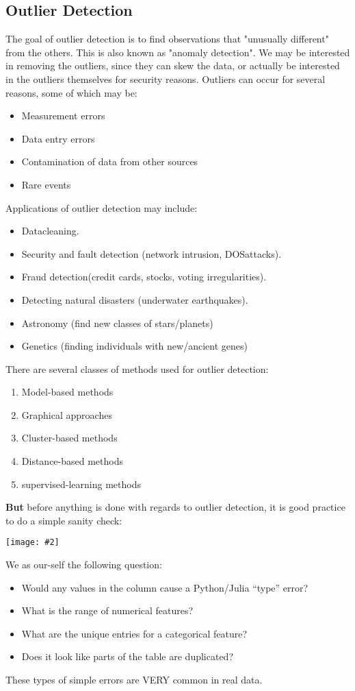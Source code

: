\documentclass{article}
\def\blu#1{{\color{blu}#1}}
\def\gre#1{{\color{gre}#1}}
\theoremstyle{definition}
\newcommand{\centerfig}[2]{\begin{center}\texttt{[image: \#2]}\end{center}}
\begin{document}
\subsection*{Outlier Detection}
The goal of outlier detection is to find observations that "unusually different" from the others. This is also known as "anomaly detection". We may be interested in removing the outliers, since they can skew the data, or actually be interested in the outliers themselves for security reasons. Outliers can occur for several reasons, some of which may be:
\begin{multicols}{2}
	\begin{itemize}
	\item Measurement errors
	\item Data entry errors
	\item Contamination of data from other sources
	\item Rare events
\end{itemize}
\end{multicols}
Applications of outlier detection may include:
\begin{itemize}
	\item Datacleaning.
	\item Security and fault detection (network intrusion, DOSattacks).
	\item Fraud detection(credit cards, stocks, voting irregularities).
	\item Detecting natural disasters (underwater earthquakes).
	\item Astronomy (find new classes of stars/planets)
	\item Genetics (finding individuals with new/ancient genes)
\end{itemize}
There are several classes of methods used for outlier detection:
\begin{enumerate}
	\item Model-based methods
	\item Graphical approaches
	\item Cluster-based methods
	\item Distance-based methods
	\item supervised-learning methods
\end{enumerate}

\textbf{But }before anything is done with regards to outlier detection, it is good practice to do a simple sanity check:
\centerfig{0.6}{Pic14}
We as our-self the following question:
\begin{itemize}
	\item Would any values in the column cause a Python/Julia \blu{“type” error}?
	\item What is the \gre{range of numerical features}?
	\item What are the \gre{unique entries for a categorical feature}?
	\item Does it look like parts of the table are \gre{duplicated}?
\end{itemize}
These types of simple errors are VERY common in real data.
\end{document}

